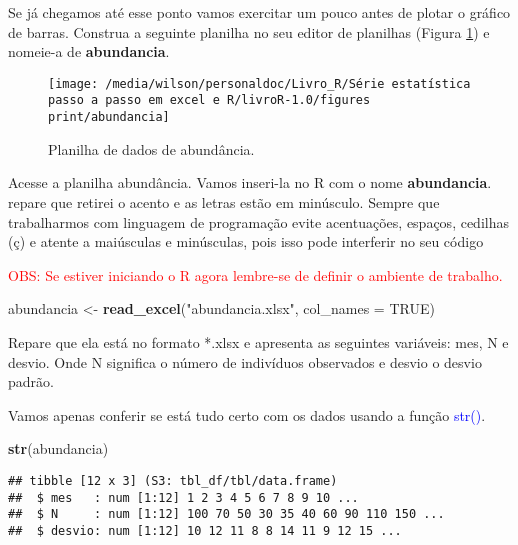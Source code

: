 \documentclass[14pt,titlepage, oneside, openany, a4paper]{book}
\newenvironment{Shaded}{\begin{snugshade}}{\end{snugshade}}
\newcommand{\DataTypeTok}[1]{\textcolor[rgb]{0.13,0.29,0.53}{#1}}
\newcommand{\KeywordTok}[1]{\textcolor[rgb]{0.13,0.29,0.53}{\textbf{#1}}}
\newcommand{\NormalTok}[1]{#1}
\newcommand{\OtherTok}[1]{\textcolor[rgb]{0.56,0.35,0.01}{#1}}
\newcommand{\StringTok}[1]{\textcolor[rgb]{0.31,0.60,0.02}{#1}}
\begin{document}
Se já chegamos até esse ponto vamos exercitar um pouco antes de plotar o gráfico de barras. Construa a seguinte planilha no seu editor de planilhas (Figura \ref{fig:abundancia}) e nomeie-a de \textbf{abundancia}.

\begin{figure}[H]

{\centering \texttt{[image: /media/wilson/personaldoc/Livro\_R/Série estatística passo a passo em excel e R/livroR-1.0/figures print/abundancia]} 

}

\caption{Planilha de dados de abundância.}\label{fig:abundancia}
\end{figure}

Acesse a planilha abundância. Vamos inseri-la no R com o nome \textbf{abundancia}. repare que retirei o acento e as letras estão em minúsculo. Sempre que trabalharmos com linguagem de programação evite acentuações, espaços, cedilhas (ç) e atente a maiúsculas e minúsculas, pois isso pode interferir no seu código

\textcolor{red}{OBS: Se estiver iniciando o R agora lembre-se de definir o ambiente de trabalho.}

\begin{Shaded}
\begin{Highlighting}[]
\NormalTok{abundancia <-}\StringTok{ }\KeywordTok{read_excel}\NormalTok{(}\StringTok{"abundancia.xlsx"}\NormalTok{, }\DataTypeTok{col_names =} \OtherTok{TRUE}\NormalTok{)}
\end{Highlighting}
\end{Shaded}

Repare que ela está no formato *.xlsx e apresenta as seguintes variáveis: mes, N e desvio. Onde N significa o número de indivíduos observados e desvio o desvio padrão.

Vamos apenas conferir se está tudo certo com os dados usando a função \textcolor{blue}{str()}.

\begin{Shaded}
\begin{Highlighting}[]
\KeywordTok{str}\NormalTok{(abundancia)}
\end{Highlighting}
\end{Shaded}

\begin{verbatim}
## tibble [12 x 3] (S3: tbl_df/tbl/data.frame)
##  $ mes   : num [1:12] 1 2 3 4 5 6 7 8 9 10 ...
##  $ N     : num [1:12] 100 70 50 30 35 40 60 90 110 150 ...
##  $ desvio: num [1:12] 10 12 11 8 8 14 11 9 12 15 ...
\end{verbatim}
\end{document}
